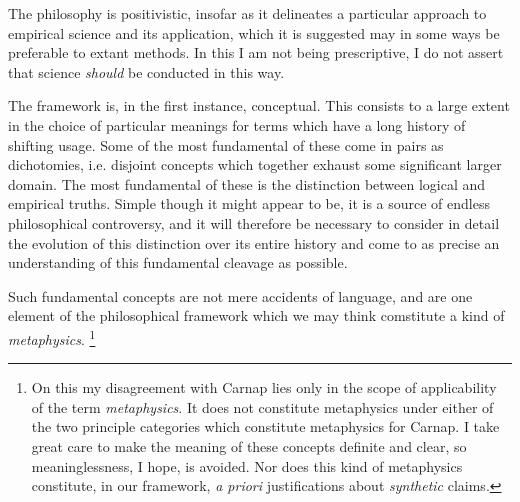 The philosophy is positivistic, insofar as it delineates a particular approach to empirical science and its application, which it is suggested may in some ways be preferable to extant methods.
In this I am not being prescriptive, I do not assert that science \emph{should} be conducted in this way.

The framework is, in the first instance, conceptual.
This consists to a large extent in the choice of particular meanings for terms which have a long history of shifting usage.
Some of the most fundamental of these come in pairs as dichotomies, i.e. disjoint concepts which together exhaust some significant larger domain.
The most fundamental of these is the distinction between logical and empirical truths.
Simple though it might appear to be, it is a source of endless philosophical controversy, and it will therefore be necessary to consider in detail the evolution of this distinction over its entire history and come to as precise an understanding of this fundamental cleavage as possible.

Such fundamental concepts are not mere accidents of language, and are one element of the philosophical framework which we may think comstitute a kind of \emph{metaphysics}.
\footnote{On this my disagreement with Carnap lies only in the scope of applicability of the term \emph{metaphysics}.
It does not constitute metaphysics under either of the two principle categories which constitute metaphysics for Carnap.
I take great care to make the meaning of these concepts definite and clear, so meaninglessness, I hope, is avoided.
Nor does this kind of metaphysics constitute, in our framework, \emph{a priori} justifications about \emph{synthetic} claims.
}%

